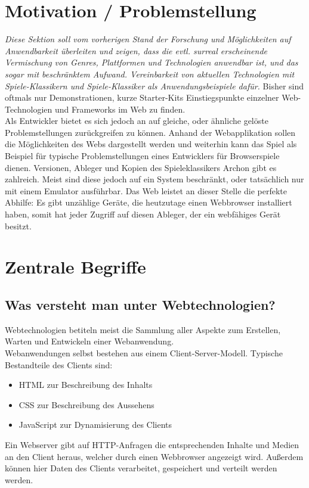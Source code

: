 \section{Motivation / Problemstellung}
\label{sec:motivation}
\emph{ Diese Sektion soll vom vorherigen Stand der Forschung und Möglichkeiten auf Anwendbarkeit überleiten und zeigen, dass die evtl. surreal erscheinende Vermischung von Genres, Plattformen und Technologien anwendbar ist, und das sogar mit beschränktem Aufwand. Vereinbarkeit von aktuellen Technologien mit Spiele-Klassikern und Spiele-Klassiker als Anwendungsbeispiele dafür.}
Bisher sind oftmals nur Demonstrationen, kurze Starter-Kits \bzw Einstiegspunkte einzelner Web-Technologien und Frameworks im Web zu finden.\\
Als Entwickler bietet es sich jedoch an auf gleiche, oder ähnliche gelöste Problemstellungen zurückgreifen zu können.
Anhand der Webapplikation sollen die Möglichkeiten des Webs dargestellt werden und weiterhin kann das Spiel als Beispiel für typische Problemstellungen eines Entwicklers für Browserspiele dienen.
Versionen, Ableger und Kopien des Spieleklassikers Archon gibt es zahlreich. Meist sind diese jedoch auf ein System beschränkt, oder tatsächlich nur mit einem Emulator ausführbar. Das Web leistet an dieser Stelle die perfekte Abhilfe: Es gibt unzählige Geräte, die heutzutage einen Webbrowser installiert haben, somit hat jeder Zugriff auf diesen Ableger, der ein webfähiges Gerät besitzt.

\section{Zentrale Begriffe}
\label{sec:zentrale_begriffe}

\subsection{Was versteht man unter Webtechnologien?}
Webtechnologien betiteln meist die Sammlung aller Aspekte zum Erstellen, Warten und Entwickeln einer Webanwendung.\\
Webanwendungen selbst bestehen aus einem Client-Server-Modell.
Typische Bestandteile des Clients sind: 
\begin{itemize}
	\item HTML zur Beschreibung des Inhalts
	\item CSS zur Beschreibung des Aussehens
	\item JavaScript zur Dynamisierung des Clients
\end{itemize}
Ein Webserver gibt auf HTTP-Anfragen die entsprechenden Inhalte und Medien an den Client heraus, welcher durch einen Webbrowser angezeigt wird. Außerdem können hier Daten des Clients verarbeitet, gespeichert und verteilt werden werden.
